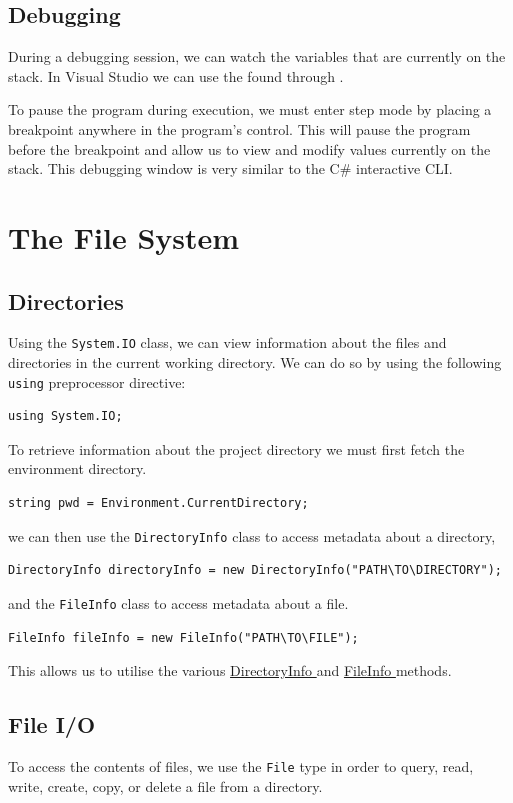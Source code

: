 \documentclass{article}
\begin{document}
\subsection{Debugging}
During a debugging session, we can watch the variables that are
currently on the stack. In Visual Studio we can use the  found through .

To pause the program during execution, we must enter step mode by
placing a breakpoint anywhere in the program's control. This will pause
the program before the breakpoint and allow us to view and modify
values currently on the stack. This debugging window is very similar to
the C\# interactive CLI. %
\section{The File System}
\subsection{Directories}
Using the \texttt{System.IO} class, we can view information
about the files and directories in the current working directory. We
can do so by using the following \texttt{using}
preprocessor directive:
\begin{verbatim}
using System.IO;
\end{verbatim}
To retrieve information about the project directory we must first fetch
the environment directory.
\begin{verbatim}
string pwd = Environment.CurrentDirectory;
\end{verbatim}
we can then use the \texttt{DirectoryInfo} class to access
metadata about a directory,
\begin{verbatim}
DirectoryInfo directoryInfo = new DirectoryInfo("PATH\TO\DIRECTORY");
\end{verbatim}
and the \texttt{FileInfo} class to access metadata about a
file.
\begin{verbatim}
FileInfo fileInfo = new FileInfo("PATH\TO\FILE");
\end{verbatim}
This allows us to utilise the various
\href{https://docs.microsoft.com/en-us/dotnet/api/system.io.directoryinfo?view=net-6.0#methods}{DirectoryInfo
} and
\href{https://docs.microsoft.com/en-us/dotnet/api/system.io.fileinfo?view=net-6.0#methods}{FileInfo
} methods.
\subsection{File I/O}
To access the contents of files, we use the \texttt{File}
type in order to query, read, write, create, copy, or delete a file
from a directory.
\end{document}
